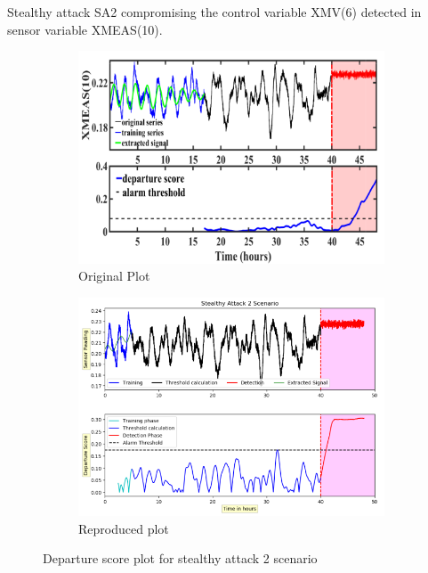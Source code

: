 Stealthy attack SA2 compromising the control variable XMV(6) detected in sensor variable XMEAS(10). 

\begin{figure}[H]	
	\centering
	\begin{subfigure}[t]{0.45\textwidth}
		\centering
		\includegraphics[width=\textwidth]{imgs/sa2orig.png}
		\caption{Original Plot}\label{fig:1a}		
	\end{subfigure}
	\qquad
	\begin{subfigure}[t]{0.45\textwidth}
		\centering
		\includegraphics[width=\textwidth]{imgs/sa2re.png}
		\caption{Reproduced plot}\label{fig:1b}
	\end{subfigure}
	\caption{Departure score plot for stealthy attack 2 scenario}\label{fig:1}
\end{figure}

